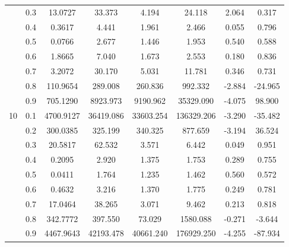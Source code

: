 \documentclass[11pt,a4paper]{report}
\begin{document}
\begin{longtable}{ | c | c || c | c | c | c | c | c | }
 & 0.3 & 13.0727 & 33.373 & 4.194 & 24.118 & 2.064 & 0.317 \\
 & 0.4 & 0.3617 & 4.441 & 1.961 & 2.466 & 0.055 & 0.796 \\
 & 0.5 & 0.0766 & 2.677 & 1.446 & 1.953 & 0.540 & 0.588 \\
 & 0.6 & 1.8665 & 7.040 & 1.673 & 2.553 & 0.180 & 0.836 \\
 & 0.7 & 3.2072 & 30.170 & 5.031 & 11.781 & 0.346 & 0.731 \\
 & 0.8 & 110.9654 & 289.008 & 260.836 & 992.332 & -2.884 & -24.965 \\
 & 0.9 & 705.1290 & 8923.973 & 9190.962 & 35329.090 & -4.075 & 98.900 \\
 \hline
\multirow{9}{*}{10} & 0.1 & 4700.9127 & 36419.086 & 33603.254 & 136329.206 & -3.290 & -35.482 \\
 & 0.2 & 300.0385 & 325.199 & 340.325 & 877.659 & -3.194 & 36.524 \\
 & 0.3 & 20.5817 & 62.532 & 3.571 & 6.442 & 0.049 & 0.951 \\
 & 0.4 & 0.2095 & 2.920 & 1.375 & 1.753 & 0.289 & 0.755 \\
 & 0.5 & 0.0411 & 1.764 & 1.235 & 1.462 & 0.560 & 0.572 \\
 & 0.6 & 0.4632 & 3.216 & 1.370 & 1.775 & 0.249 & 0.781 \\
 & 0.7 & 17.0464 & 38.265 & 3.071 & 9.462 & 0.213 & 0.818 \\
 & 0.8 & 342.7772 & 397.550 & 73.029 & 1580.088 & -0.271 & -3.644 \\
 & 0.9 & 4467.9643 & 42193.478 & 40661.240 & 176929.250 & -4.255 & -87.934 \\
 \hline
\hline
\end{longtable}
\end{document}
